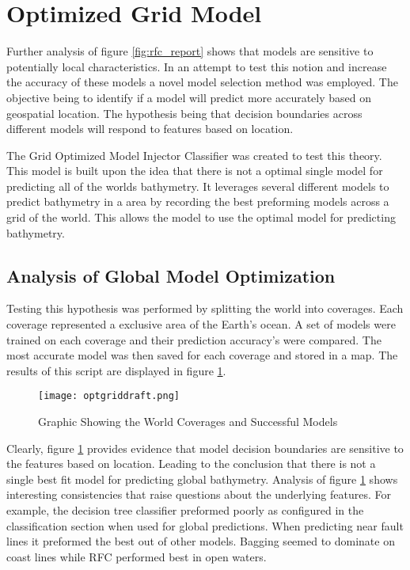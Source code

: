 \section{Optimized Grid Model}
\setlength{\parindent}{10ex}
Further analysis of figure \ref{fig:rfc_report} shows that models are sensitive to potentially local characteristics.
In an attempt to test this notion and increase the accuracy of these models a novel model selection method was employed.
The objective being to identify if a model will predict more accurately based on geospatial location.
The hypothesis being that decision boundaries across different models will respond to features based on location.

The Grid Optimized Model Injector Classifier was created to test this theory.
This model is built upon the idea that there is not a optimal single model for predicting all of the worlds bathymetry.
It leverages several different models to predict bathymetry in a area by recording the best preforming models across a grid of the world.
This allows the model to use the optimal model for predicting bathymetry.

\subsection{Analysis of Global Model Optimization}
Testing this hypothesis was performed by splitting the world into coverages.
Each coverage represented a exclusive area of the Earth's ocean.
A set of models were trained on each coverage and their prediction accuracy's were compared.
The most accurate model was then saved for each coverage and stored in a map.
The results of this script are displayed in figure \ref{fig:coveragegrid}.

\begin{figure}[htp]
    \centering
    \texttt{[image: optgriddraft.png]}
    \caption{Graphic Showing the World Coverages and Successful Models}
    \label{fig:coveragegrid}
\end{figure}

\par
Clearly, figure \ref{fig:coveragegrid} provides evidence that model decision boundaries are sensitive to the features based on location.
Leading to the conclusion that there is not a single best fit model for predicting global bathymetry.
Analysis of figure \ref{fig:coveragegrid} shows interesting consistencies that raise questions about the underlying features.
For example, the decision tree classifier preformed poorly as configured in the classification section when used for global predictions.
When predicting near fault lines it preformed the best out of other models.
Bagging seemed to dominate on coast lines while \ac{RFC} performed best in open waters.


